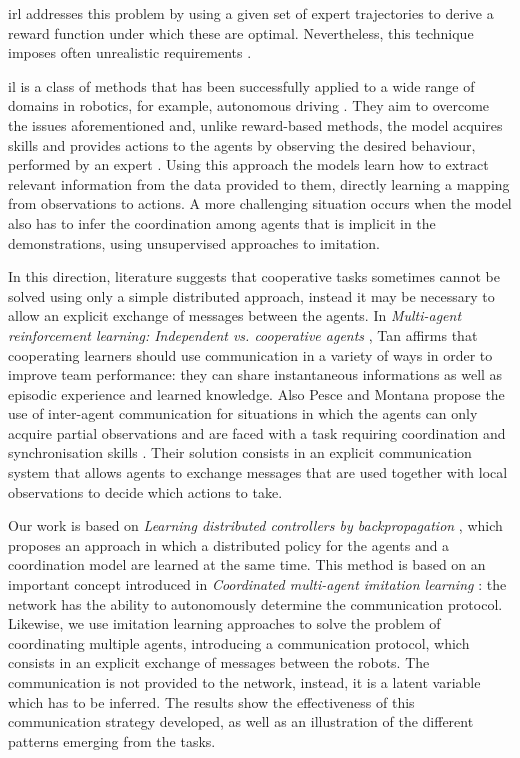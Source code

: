 \gls{irl} addresses this problem by using a given set of expert trajectories to 
derive a reward function under which these are optimal. 
Nevertheless, this technique imposes often unrealistic requirements 
\cite[][]{vsovsic2016inverse}.

\gls{il} is a class of methods that has been successfully applied to a wide range of 
domains in robotics, for example, autonomous driving 
\cite[][]{schaal1999imitation, stepputtis2019imitation}. They aim to overcome the 
issues aforementioned and, unlike reward-based methods, the model 
acquires skills and provides actions to the agents by observing the desired 
behaviour, performed by an expert \cite[][]{song2018multi, zhang2018deep, 
	billard2008survey}.
Using this approach the models learn how to extract relevant information from 
the data provided to them, directly learning a mapping from observations to 
actions. 
A more challenging situation occurs when the model also has to infer the 
coordination among agents that is implicit in the demonstrations, using 
unsupervised approaches to imitation.

In this direction, literature suggests that cooperative tasks sometimes cannot be 
solved using only a simple distributed approach, instead it may be necessary to 
allow an explicit exchange of messages between the agents.
In \emph{Multi-agent reinforcement learning: Independent vs. cooperative 
	agents} \cite[][]{tan1993multi}, Tan affirms that cooperating learners should use 
communication in a variety of ways in order to improve team performance: they 
can share instantaneous informations as well as episodic experience and learned 
knowledge.
Also Pesce and Montana propose the use of inter-agent communication for 
situations in which the agents can only acquire partial observations and are faced 
with a task requiring coordination and synchronisation skills 
\cite[][]{pesce2019improving}. Their solution consists in an explicit 
communication system that allows agents to exchange messages that are used 
together with local observations to decide which actions to take.

Our work is based on \emph{Learning distributed controllers by backpropagation}
\cite[][]{marcoverna2020}, which proposes an approach in which a distributed 
policy for the agents and a coordination model are learned at the same time. 
This method is based on an important concept introduced in \emph{Coordinated 
	multi-agent imitation learning} \cite[][]{le2017coordinated}: the network has the 
ability to autonomously determine the communication protocol.
Likewise, we use imitation learning approaches to solve the problem of 
coordinating multiple agents, introducing a communication protocol, which 
consists in an explicit exchange of messages between the robots. The 
communication is not provided to the network, instead, it is a latent variable 
which has to be inferred.   
The results show the effectiveness of this communication strategy developed, as 
well as an illustration of the different patterns emerging from the tasks.
